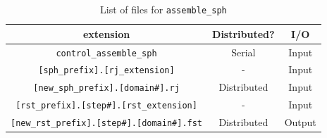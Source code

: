 %
\begin{table}[htp]
\caption{List of files for {\tt assemble\_sph} }
\begin{center} 
\begin{tabular}{|c|c|c|}
\hline
 extension & Distributed? & I/O \\ \hline
\verb|control_assemble_sph| & Serial & Input \\ \hline
\verb|[sph_prefix].[rj_extension]|  & - & Input \\  \hline
\verb|[new_sph_prefix].[domain#].rj| &  Distributed & Input \\ \hline
\verb|[rst_prefix].[step#].[rst_extension]| & - & Input  \\
\verb|[new_rst_prefix].[step#].[domain#].fst| &  Distributed & Output \\ \hline
\end{tabular}
\end{center}
\label{table:assemble_newsph}
\end{table}
%

